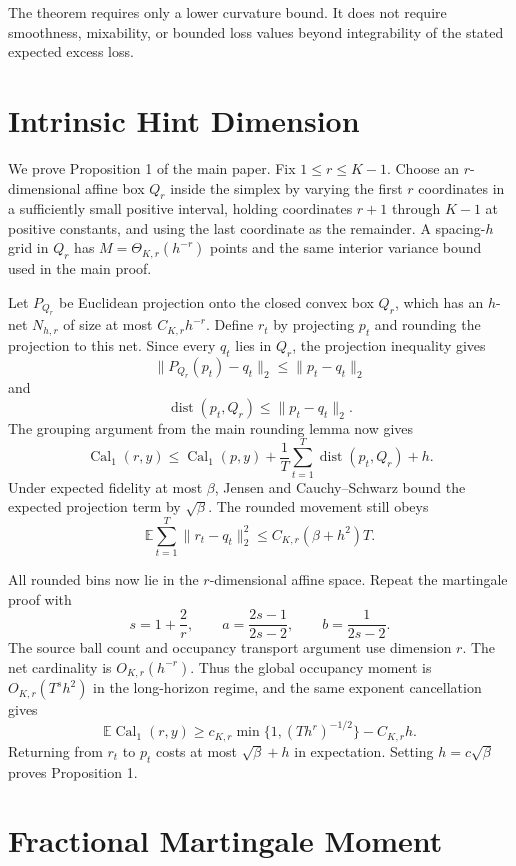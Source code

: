 \documentclass[twoside]{article}
\newcommand{\E}{\mathbb E}
\newcommand{\calone}{\operatorname{Cal}_1}
\newcommand{\1}{\mathbf 1}
\begin{document}
The theorem requires only a lower curvature bound. It does not require
smoothness, mixability, or bounded loss values beyond integrability of the
stated expected excess loss.

\section{Intrinsic Hint Dimension}

We prove Proposition 1 of the main paper. Fix $1\leq r\leq K-1$. Choose an
$r$-dimensional affine box $Q_r$ inside the simplex by varying the first $r$
coordinates in a sufficiently small positive interval, holding coordinates
$r+1$ through $K-1$ at positive constants, and using the last coordinate as
the remainder. A spacing-$h$ grid in $Q_r$ has
$M=\Theta_{K,r}(h^{-r})$ points and the same interior variance bound used in
the main proof.

Let $P_{Q_r}$ be Euclidean projection onto the closed convex box $Q_r$, which
has an $h$-net $N_{h,r}$ of size at most $C_{K,r}h^{-r}$. Define $r_t$ by
projecting $p_t$ and rounding the projection to this net. Since every $q_t$
lies in $Q_r$, the projection inequality gives
\[
 \|P_{Q_r}(p_t)-q_t\|_2\leq\|p_t-q_t\|_2
\]
and
\[
 \operatorname{dist}(p_t,Q_r)\leq\|p_t-q_t\|_2.
\]
The grouping argument from the main rounding lemma now gives
\[
 \calone(r,y)\leq\calone(p,y)
 +\frac1T\sum_{t=1}^T\operatorname{dist}(p_t,Q_r)+h.
\]
Under expected fidelity at most $\beta$, Jensen and Cauchy--Schwarz bound the
expected projection term by $\sqrt\beta$. The rounded movement still obeys
\[
 \E\sum_{t=1}^T\|r_t-q_t\|_2^2\leq C_{K,r}(\beta+h^2)T.
\]

All rounded bins now lie in the $r$-dimensional affine space. Repeat the
martingale proof with
\[
 s=1+\frac2r,
 \qquad
 a=\frac{2s-1}{2s-2},
 \qquad
 b=\frac1{2s-2}.
\]
The source ball count and occupancy transport argument use dimension $r$.
The net cardinality is $O_{K,r}(h^{-r})$. Thus the global occupancy moment is
$O_{K,r}(T^sh^2)$ in the long-horizon regime, and the same exponent
cancellation gives
\[
 \E\calone(r,y)
 \geq c_{K,r}\min\{1,(Th^r)^{-1/2}\}-C_{K,r}h.
\]
Returning from $r_t$ to $p_t$ costs at most $\sqrt\beta+h$ in expectation.
Setting $h=c\sqrt\beta$ proves Proposition 1.

\section{Fractional Martingale Moment}
\end{document}
